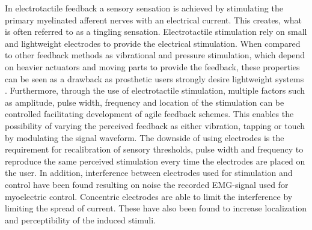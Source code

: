 In electrotactile feedback a sensory sensation is achieved by stimulating the primary myelinated afferent nerves with an electrical current. This creates, what is often referred to as a tingling sensation. Electrotactile stimulation rely on small and lightweight electrodes to provide the electrical stimulation. When compared to other feedback methods as vibrational and pressure stimulation, which depend on heavier actuators and moving parts to provide the feedback, these properties can be seen as a drawback as prosthetic users strongly desire lightweight systems \cite{Stephens-Fripp2018,Benz2016}. Furthermore, through the use of electrotactile stimulation, multiple factors such as amplitude, pulse width, frequency and location of the stimulation can be controlled facilitating development of agile feedback schemes. This enables the possibility of varying the perceived feedback as either vibration, tapping or touch by modulating the signal waveform. The downside of using electrodes is the requirement for recalibration of sensory thresholds, pulse width and frequency to reproduce the same perceived stimulation every time the electrodes are placed on the user. In addition, interference between electrodes used for stimulation and control have been found resulting on noise the recorded EMG-signal used for myoelectric control. Concentric electrodes are able to limit the interference by limiting the spread of current. These have also been found to increase localization and perceptibility of the induced stimuli. \cite{Stephens-Fripp2018,Schofield2014,Antfolk2018} 







